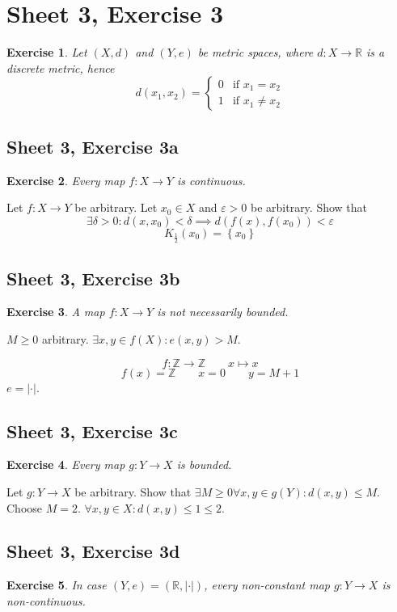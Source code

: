 \documentclass{article}
\newtheorem{ex}{Exercise} %
\newcommand{\set}[1]{\left\{#1\right\}}
\newcommand{\card}[1]{\left|#1\right|}
\begin{document}
\section{Sheet 3, Exercise 3}
\begin{ex}
  Let $(X, d)$ and $(Y, e)$ be metric spaces, where $d: X \to \mathbb R$ is a discrete metric,
  hence
  \[
    d(x_1, x_2) = \begin{cases}
      0 & \text{if } x_1 = x_2 \\
      1 & \text{if } x_1 \neq x_2
    \end{cases}
  \]
\end{ex}

\subsection{Sheet 3, Exercise 3a}
\begin{ex}
  Every map $f: X \to Y$ is continuous.
\end{ex}

Let $f: X \to Y$ be arbitrary.
Let $x_0 \in X$ and $\varepsilon > 0$ be arbitrary.
Show that
\[ \exists \delta > 0: d(x, x_0) < \delta \implies d(f(x), f(x_0)) < \varepsilon \]
\[ K_{\frac12}(x_0) = \set{x_0} \]

\subsection{Sheet 3, Exercise 3b}
\begin{ex}
  A map $f: X \to Y$ is not necessarily bounded.
\end{ex}

$M \geq 0$ arbitrary. $\exists x,y \in f(X): e(x,y) > M$.

\[ f: \mathbb Z \to \mathbb Z \qquad x \mapsto x \]
\[ f(x) = \mathbb Z \qquad x = 0 \qquad y = M + 1 \]
$e = \card{\cdot}$.

\subsection{Sheet 3, Exercise 3c}
\begin{ex}
  Every map $g: Y \to X$ is bounded.
\end{ex}
Let $g: Y \to X$ be arbitrary.
Show that $\exists M \geq 0 \forall x,y \in g(Y): d(x,y) \leq M$.
Choose $M = 2$. $\forall x,y \in X: d(x,y) \leq 1 \leq 2$.

\subsection{Sheet 3, Exercise 3d}
\begin{ex}
  In case $(Y, e) = (\mathbb R, \card{\cdot})$, every non-constant map $g: Y \to X$ is non-continuous.
\end{ex}
\end{document}

